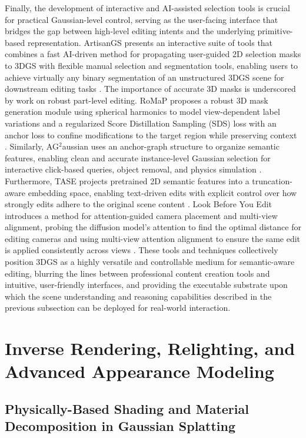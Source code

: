 \documentclass[11pt]{article}
\begin{document}
Finally, the development of interactive and AI-assisted selection tools is crucial for practical Gaussian-level control, serving as the user-facing interface that bridges the gap between high-level editing intents and the underlying primitive-based representation. ArtisanGS presents an interactive suite of tools that combines a fast AI-driven method for propagating user-guided 2D selection masks to 3DGS with flexible manual selection and segmentation tools, enabling users to achieve virtually any binary segmentation of an unstructured 3DGS scene for downstream editing tasks \cite{ref560}. The importance of accurate 3D masks is underscored by work on robust part-level editing. RoMaP proposes a robust 3D mask generation module using spherical harmonics to model view-dependent label variations and a regularized Score Distillation Sampling (SDS) loss with an anchor loss to confine modifications to the target region while preserving context \cite{ref561}. Similarly, AG\(^2\)aussian uses an anchor-graph structure to organize semantic features, enabling clean and accurate instance-level Gaussian selection for interactive click-based queries, object removal, and physics simulation \cite{ref562}. Furthermore, TASE projects pretrained 2D semantic features into a truncation-aware embedding space, enabling text-driven edits with explicit control over how strongly edits adhere to the original scene content \cite{ref563}. Look Before You Edit introduces a method for attention-guided camera placement and multi-view alignment, probing the diffusion model's attention to find the optimal distance for editing cameras and using multi-view attention alignment to ensure the same edit is applied consistently across views \cite{ref564}. These tools and techniques collectively position 3DGS as a highly versatile and controllable medium for semantic-aware editing, blurring the lines between professional content creation tools and intuitive, user-friendly interfaces, and providing the executable substrate upon which the scene understanding and reasoning capabilities described in the previous subsection can be deployed for real-world interaction.

\section{Inverse Rendering, Relighting, and Advanced Appearance Modeling}

\subsection{Physically-Based Shading and Material Decomposition in Gaussian Splatting}
\end{document}
